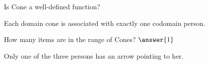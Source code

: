 \documentclass{ximera}
\begin{document}
\begin{exercise}
Is Cone a well-defined function?
  \begin{multipleChoice}
  \end{multipleChoice}
  \begin{feedback}
Each domain cone is associated with exactly one codomain person.
  \end{feedback}
\end{exercise}







\begin{exercise}
How many items are in the range of Cones? $\answer{1}$
  \begin{feedback}
Only one of the three persons has an arrow pointing to her.
  \end{feedback}
\end{exercise}
\end{document}
